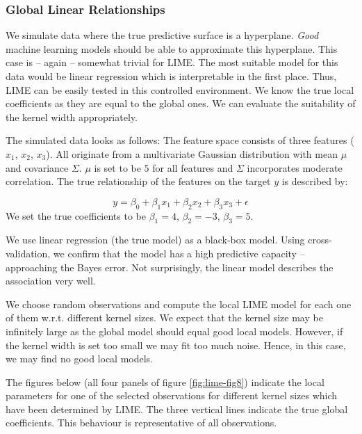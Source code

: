 \documentclass[
]{krantz}
\begin{document}
\hypertarget{id411}{%
\subsubsection{Global Linear Relationships}\label{id411}}

We simulate data where the true predictive surface is a hyperplane.
\emph{Good} machine learning models should be able to approximate this hyperplane.
This case is -- again -- somewhat trivial for LIME.
The most suitable model for this data would be linear regression which is interpretable in the first place.
Thus, LIME can be easily tested in this controlled environment.
We know the true local coefficients as they are equal to the global ones.
We can evaluate the suitability of the kernel width appropriately.

The simulated data looks as follows:
The feature space consists of three features (\(x_1\), \(x_2\), \(x_3\)).
All originate from a multivariate Gaussian distribution with mean \(\mu\) and covariance \(\Sigma\).
\(\mu\) is set to be \(5\) for all features and \(\Sigma\) incorporates moderate correlation.
The true relationship of the features on the target \(y\) is described by:

\[ y = \beta_0 + \beta_1 x_1 + \beta_2 x_2 + \beta_3 x_3 + \epsilon \]
We set the true coefficients to be \(\beta_1 = 4\), \(\beta_2 = -3\), \(\beta_3 = 5\).

We use linear regression (the true model) as a black-box model.
Using cross-validation, we confirm that the model has a high predictive capacity -- approaching the Bayes error.
Not surprisingly, the linear model describes the association very well.

We choose random observations and compute the local LIME model for each one of them w.r.t. different kernel sizes.
We expect that the kernel size may be infinitely large as the global model should equal good local models.
However, if the kernel width is set too small we may fit too much noise.
Hence, in this case, we may find no good local models.

The figures below (all four panels of figure \ref{fig:lime-fig8}) indicate the local parameters for one of the selected observations for different kernel sizes which have been determined by LIME.
The three vertical lines indicate the true global coefficients.
This behaviour is representative of all observations.
\end{document}
